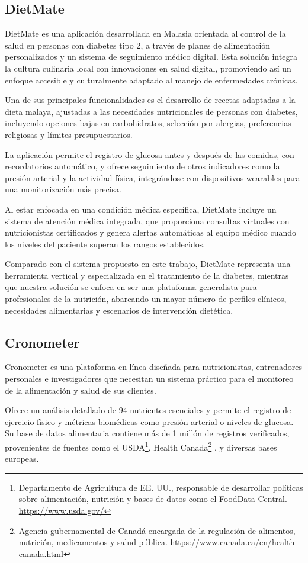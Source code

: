 \subsection{DietMate\cite{Dietmate}}
DietMate es una aplicación desarrollada en Malasia orientada al control de la salud en personas con diabetes tipo 2, a través de planes de alimentación personalizados y un sistema de seguimiento médico digital. Esta solución integra la cultura culinaria local con innovaciones en salud digital, promoviendo así un enfoque accesible y culturalmente adaptado al manejo de enfermedades crónicas.

Una de sus principales funcionalidades es el desarrollo de recetas adaptadas a la dieta malaya, ajustadas a las necesidades nutricionales de personas con diabetes, incluyendo opciones bajas en carbohidratos, selección por alergias, preferencias religiosas y límites presupuestarios.

La aplicación permite el registro de glucosa antes y después de las comidas, con recordatorios automático, y ofrece seguimiento de otros indicadores como la presión arterial y la actividad física, integrándose con dispositivos wearables para una monitorización más precisa.

Al estar enfocada en una condición médica específica, DietMate incluye un sistema de atención médica integrada, que proporciona consultas virtuales con nutricionistas certificados y genera alertas automáticas al equipo médico cuando los niveles del paciente superan los rangos establecidos.

Comparado con el sistema propuesto en este trabajo, DietMate representa una herramienta vertical y especializada en el tratamiento de la diabetes, mientras que nuestra solución se enfoca en ser una plataforma generalista para profesionales de la nutrición, abarcando un mayor número de perfiles clínicos, necesidades alimentarias y escenarios de intervención dietética.

\subsection{Cronometer\cite{Cronometer}}
Cronometer es una plataforma en línea diseñada para nutricionistas, entrenadores personales e investigadores que necesitan un sistema práctico para el monitoreo de la alimentación y salud de sus clientes.

Ofrece un análisis detallado de 94 nutrientes esenciales y permite el registro de ejercicio físico y métricas biomédicas como presión arterial o niveles de glucosa. Su base de datos alimentaria contiene más de 1 millón de registros verificados, provenientes de fuentes como el USDA\footnote{Departamento de Agricultura de EE. UU., responsable de desarrollar políticas sobre alimentación, nutrición y bases de datos como el FoodData Central. \url{https://www.usda.gov/}}, Health Canada\footnote{Agencia gubernamental de Canadá encargada de la regulación de alimentos, nutrición, medicamentos y salud pública. \url{https://www.canada.ca/en/health-canada.html}}
, y diversas bases europeas.

